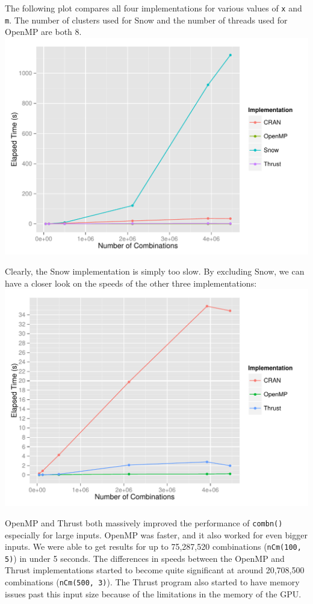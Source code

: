 The following plot compares all four implementations for various values of \texttt{x} and \texttt{m}. The number of clusters used for Snow and the number of threads used for OpenMP are both 8.\\

\includegraphics{all.pdf}\\
\null

Clearly, the Snow implementation is simply too slow. By excluding Snow, we can have a closer look on the speeds of the other three implementations:\\

\includegraphics{withoutsnow.pdf}\\
\null

OpenMP and Thrust both massively improved the performance of \texttt{combn()} especially for large inputs. OpenMP was faster, and it also worked for even bigger inputs. We were able to get results for up to 75,287,520 combinations (\texttt{nCm(100, 5)}) in under 5 seconds. The differences in speeds between the OpenMP and Thrust implementations started to become quite significant at around 20,708,500 combinations (\texttt{nCm(500, 3)}). The Thrust program also started to have memory issues past this input size because of the limitations in the memory of the GPU.\\
\null

